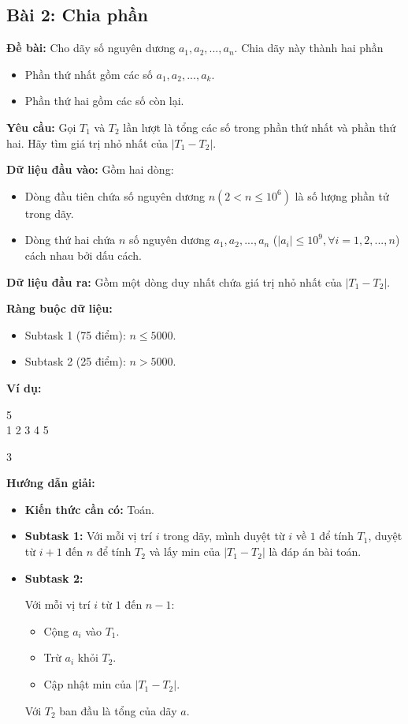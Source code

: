 \documentclass[12pt]{scrartcl}  %
\begin{document}
\subsection{Bài 2: Chia phần}
\textbf{Đề bài:}
Cho dãy số nguyên dương $a_1, a_2, ..., a_n$. Chia dãy này thành hai phần
\begin{itemize}
    \item Phần thứ nhất gồm các số $a_1, a_2, ..., a_k$.
    \item Phần thứ hai gồm các số còn lại.
\end{itemize}

\textbf{Yêu cầu:}
Gọi $T_1$ và $T_2$ lần lượt là tổng các số trong phần thứ nhất và phần thứ hai. Hãy tìm giá trị nhỏ nhất của $|T_1 - T_2|$.

\textbf{Dữ liệu đầu vào:}
Gồm hai dòng:
\begin{itemize}
    \item Dòng đầu tiên chứa số nguyên dương $n (2 < n \leq 10^6)$ là số lượng phần tử trong dãy.
    \item Dòng thứ hai chứa $n$ số nguyên dương $a_1, a_2, ..., a_n$ ($ | a_i | \le 10^9, \forall i = 1,2,...,n$) cách nhau bởi dấu cách.
\end{itemize}

\textbf{Dữ liệu đầu ra:}
Gồm một dòng duy nhất chứa giá trị nhỏ nhất của $|T_1 - T_2|$.

\textbf{Ràng buộc dữ liệu:}

\begin{itemize}
    \item Subtask 1 (75 điểm): $n \le 5000$.
    \item Subtask 2 (25 điểm): $n > 5000$.
\end{itemize}

\textbf{Ví dụ:}
\begin{tcolorbox}[colback=gray!5!white, colframe=blue!50!black, title=Input]
5\\
1 2 3 4 5
\end{tcolorbox}
\begin{tcolorbox}[colback=gray!5!white, colframe=green!50!black, title=Output]
3
\end{tcolorbox}

\textbf{Hướng dẫn giải:}
\begin{itemize}
    \item \textbf{Kiến thức cần có:} Toán.
    \item \textbf{Subtask 1:} Với mỗi vị trí $i$ trong dãy, mình duyệt từ $i$ về $1$ để
    tính $T_1$, duyệt từ $i + 1$ đến $n$ để tính $T_2$ và lấy min của $|T_1 - T_2|$ là đáp án bài toán.
    \item \textbf{Subtask 2:}
    
    Với mỗi vị trí $i$ từ $1$ đến $n - 1$:
    \begin{itemize}
        \item Cộng $a_i$ vào $T_1$.
        \item Trừ $a_i$ khỏi $T_2$.
        \item Cập nhật min của $|T_1 - T_2|$.
    \end{itemize}
    
    Với $T_2$ ban đầu là tổng của dãy $a$.
\end{itemize}
\end{document}
